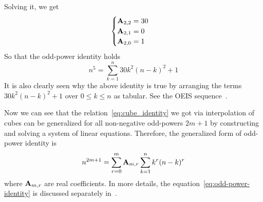 Solving it, we get
\begin{equation*}
    \begin{cases}
        {\mathbf{A}} \sb{2,2} = 30 \\
        {\mathbf{A}} \sb{2,1} = 0 \\
        {\mathbf{A}} \sb{2,0} = 1
    \end{cases}
\end{equation*}
So that the odd-power identity holds
\begin{equation*}
    n^5 = \sum_{k=1}^{n} 30k^2(n-k)^2 + 1
\end{equation*}
It is also clearly seen
why the above identity is true by arranging the terms $30k^2(n-k)^2 + 1$ over $0 \leq k \leq n$ as tabular.
See the OEIS sequence~\cite{kolosov2018fifth}.

Now we can see that the relation~\eqref{eq:cube_identity}
we got via interpolation of cubes
can be generalized for all non-negative odd-powers $2m+1$ by constructing and solving a system of linear equations.
Therefore, the generalized form of odd-power identity is
\begin{equation}
    n^{2m+1} = \sum_{r=0}^{m} {\mathbf{A}} \sb{m,r} \sum_{k=1}^{n} k^{r} (n-k)^{r}\label{eq:odd-power-identity}
\end{equation}
where ${\mathbf{A}} \sb{m,r}$ are real coefficients.
In more details, the equation~\eqref{eq:odd-power-identity} is discussed
separately in~\cite{kolosov2022106, kolosov2023polynomial}.

